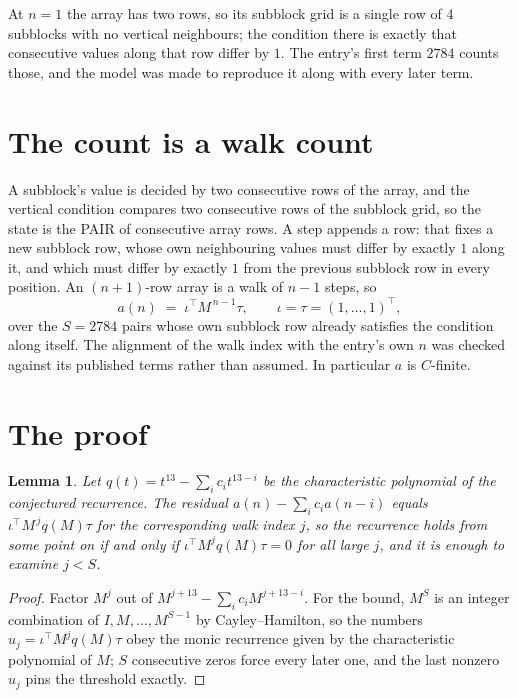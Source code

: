 \documentclass[11pt,a4paper]{article}
\theoremstyle{plain}
\newtheorem{lemma}[theorem]{Lemma}
\theoremstyle{definition}
\begin{document}
At $n=1$ the array has two rows, so its subblock grid is a single row of $4$ subblocks with
no vertical neighbours; the condition there is exactly that consecutive values along that row
differ by $1$. The entry's first term $2784$ counts those, and the model was made to
reproduce it along with every later term.

\section{The count is a walk count}

A subblock's value is decided by two consecutive rows of the array, and the
vertical condition compares two consecutive rows of the subblock grid, so the state is the
PAIR of consecutive array rows. A step appends a row: that fixes a new subblock row, whose own
neighbouring values must differ by exactly $1$ along it, and which must differ by exactly
$1$ from the previous subblock row in every position. An $(n+1)$-row array is a walk of
$n-1$ steps, so
\[
a(n)\;=\;\iota^{\!\top}M^{\,n-1}\tau,\qquad\iota=\tau=(1,\dots,1)^{\!\top},
\]
over the $S=2784$ pairs whose own subblock row already satisfies the condition along itself.
The alignment of the walk index with the entry's own $n$ was checked against its published
terms rather than assumed. In particular $a$ is $C$-finite.

\section{The proof}

\begin{lemma}\label{lem:crit}
Let $q(t)=t^{13}-\sum_i c_it^{13-i}$ be the characteristic polynomial of the
conjectured recurrence. The residual $a(n)-\sum_ic_ia(n-i)$ equals
$\iota^{\!\top}M^{\,j}q(M)\tau$ for the corresponding walk index $j$, so the recurrence
holds from some point on if and only if $\iota^{\!\top}M^{j}q(M)\tau=0$ for all large $j$,
and it is enough to examine $j<S$.
\end{lemma}

\begin{proof}
Factor $M^{j}$ out of $M^{j+13}-\sum_ic_iM^{j+13-i}$. For the bound, $M^{S}$
is an integer combination of $I,M,\dots,M^{S-1}$ by Cayley--Hamilton, so the numbers
$u_j=\iota^{\!\top}M^{j}q(M)\tau$ obey the monic recurrence given by the characteristic
polynomial of $M$; $S$ consecutive zeros force every later one, and the last nonzero $u_j$
pins the threshold exactly.
\end{proof}
\end{document}
